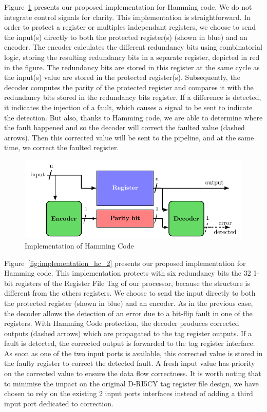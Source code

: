 Figure~\ref{fig:implementation_hc_1} presents our proposed implementation for Hamming code. We do not integrate control signals for clarity. This implementation is straightforward. In order to protect a register or multiples independant registers, we choose to send the input(s) directly to both the protected register(s) (shown in blue) and an encoder. The encoder calculates the different redundancy bits using combinatorial logic, storing the resulting redundancy bits in a separate register, depicted in red in the figure. The redundancy bits are stored in this register at the same cycle as the input(s) value are stored in the protected register(s). Subsequently, the decoder computes the parity of the protected register and compares it with the redundancy bits stored in the redundancy bits register. If a difference is detected, it indicates the injection of a fault, which causes a signal to be sent to indicate the detection. But also, thanks to Hamming code, we are able to determine where the fault happened and so the decoder will correct the faulted value (dashed arrows). Then this corrected value will be sent to the pipeline, and at the same time, we correct the faulted register.

\begin{figure}[ht]
    \centering
    \includegraphics[page=2, width=\textwidth]{c5_countermeasures_dift/img/archi_contremesures.pdf}
    \caption{Implementation of Hamming Code}
    \label{fig:implementation_hc_1}
\end{figure}

Figure~\ref{fig:implementation_hc_2} presents our proposed implementation for Hamming code. This implementation protects with six redundancy bits the 32 1-bit registers of the Register File Tag of our processor, because the structure is different from the others registers. We choose to send the input directly to both the protected register (shown in blue) and an encoder. 
As in the previous case, the decoder allows the detection of an error due to a bit-flip fault in one of the registers. With Hamming Code protection, the decoder produces corrected outputs (dashed arrows) which are propagated to the tag register outputs. If a fault is detected, the corrected output is forwarded to the tag register interface. As soon as one of the two input ports is available, this corrected value is stored in the faulty register to correct the detected fault. A fresh input value has priority on the corrected value to ensure the data flow correctness. It is worth noting that to minimise the impact on the original D-RI5CY tag register file design, we have chosen to rely on the existing 2 input ports interfaces instead of adding a third input port dedicated to correction.

